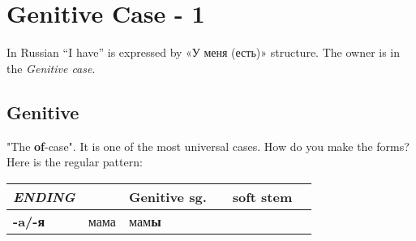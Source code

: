 \chapter{Genitive Case - 1}\label{genitive-case---1}

In Russian ``I have'' is expressed by «У меня (есть)» structure. The
owner is in the \emph{Genitive case}.

\section{Genitive}\label{genitive}

"The \textbf{of}-case". It is one of the most universal cases. How do
you make the forms? Here is the regular pattern:

\begin{longtable}[]{@{}llllll@{}}
\toprule
\begin{minipage}[b]{0.16\columnwidth}\raggedright\strut
\textbf{\emph{ENDING}}\strut
\end{minipage} & \begin{minipage}[b]{0.16\columnwidth}\raggedright\strut
\strut
\end{minipage} & \begin{minipage}[b]{0.16\columnwidth}\raggedright\strut
\textbf{Genitive sg.}\strut
\end{minipage} & \begin{minipage}[b]{0.16\columnwidth}\raggedright\strut
\strut
\end{minipage} & \begin{minipage}[b]{0.16\columnwidth}\raggedright\strut
soft stem\strut
\end{minipage} & \begin{minipage}[b]{0.16\columnwidth}\raggedright\strut
\strut
\end{minipage}\tabularnewline
\midrule
\endhead
\begin{minipage}[t]{0.16\columnwidth}\raggedright\strut
\textbf{-a/-я}\strut
\end{minipage} & \begin{minipage}[t]{0.16\columnwidth}\raggedright\strut
мама\strut
\end{minipage} & \begin{minipage}[t]{0.16\columnwidth}\raggedright\strut
мам\textbf{ы}\strut
\end{minipage} & \begin{minipage}[t]{0.16\columnwidth}\raggedright\strut
\strut
\end{minipage} & \begin{minipage}[t]{0.16\columnwidth}\raggedright\strut

\end{minipage}
\end{longtable}
